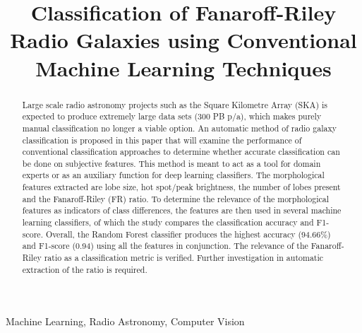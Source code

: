 \documentclass[conference]{IEEEtran}
\begin{document}
\title{Classification of Fanaroff-Riley Radio Galaxies using Conventional Machine Learning Techniques}

\author{
\and
{}
}

\maketitle

\begin{abstract}
Large scale radio astronomy projects such as the Square Kilometre Array (SKA) is expected to produce extremely large data sets (300 PB p/a), which makes purely manual classification no longer a viable option. An automatic method of radio galaxy classification is proposed in this paper that will examine the performance of conventional classification approaches to determine whether accurate classification can be done on subjective features.
This method is meant to act as a tool for domain experts or as an auxiliary function for deep learning classifiers. The morphological features extracted are lobe size, hot spot/peak brightness, the number of lobes present and the Fanaroff-Riley (FR) ratio. To determine the relevance of the morphological features as indicators of class differences, the features are then used in several machine learning classifiers, of which the study compares the classification accuracy and F1-score. Overall, the Random Forest classifier produces the highest accuracy (94.66\%) and F1-score (0.94) using all the features in conjunction. The relevance of the Fanaroff-Riley ratio as a classification metric is verified. Further investigation in automatic extraction of the ratio is required. 

\end{abstract}

\begin{IEEEkeywords}
Machine Learning, Radio Astronomy, Computer Vision 
\end{IEEEkeywords}
\end{document}

